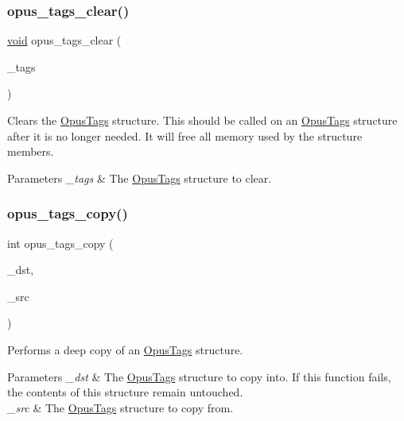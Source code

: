 \subsubsection{\texorpdfstring{opus\+\_\+tags\+\_\+clear()}{opus\_tags\_clear()}}
{\footnotesize\ttfamily \hyperlink{png_8h_ac9c84fa68bbad002983e35ce3663c686}{void} opus\+\_\+tags\+\_\+clear (\begin{DoxyParamCaption}\item[{\hyperlink{struct_opus_tags}{Opus\+Tags} $\ast$}]{\+\_\+tags }\end{DoxyParamCaption})}

Clears the \hyperlink{struct_opus_tags}{Opus\+Tags} structure. This should be called on an \hyperlink{struct_opus_tags}{Opus\+Tags} structure after it is no longer needed. It will free all memory used by the structure members. 
\begin{DoxyParams}{Parameters}
{\em \+\_\+tags} & The \hyperlink{struct_opus_tags}{Opus\+Tags} structure to clear. \\
\hline
\end{DoxyParams}
\mbox{\label{group__header__info_gaceda528fa8f9f9ad1443df2eeeeaa8bf}} 
\subsubsection{\texorpdfstring{opus\+\_\+tags\+\_\+copy()}{opus\_tags\_copy()}}
{\footnotesize\ttfamily int opus\+\_\+tags\+\_\+copy (\begin{DoxyParamCaption}\item[{\hyperlink{struct_opus_tags}{Opus\+Tags} $\ast$}]{\+\_\+dst,  }\item[{\hyperlink{zconf_8h_a2c212835823e3c54a8ab6d95c652660e}{const} \hyperlink{struct_opus_tags}{Opus\+Tags} $\ast$}]{\+\_\+src }\end{DoxyParamCaption})}

Performs a deep copy of an \hyperlink{struct_opus_tags}{Opus\+Tags} structure. 
\begin{DoxyParams}{Parameters}
{\em \+\_\+dst} & The \hyperlink{struct_opus_tags}{Opus\+Tags} structure to copy into. If this function fails, the contents of this structure remain untouched. \\
\hline
{\em \+\_\+src} & The \hyperlink{struct_opus_tags}{Opus\+Tags} structure to copy from. \\
\hline
\end{DoxyParams}


